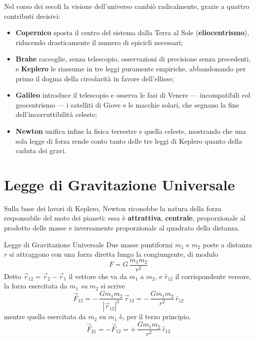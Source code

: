 Nel corso dei secoli la visione dell'universo cambiò radicalmente, grazie a quattro contributi decisivi:
\begin{itemize}
    \item \textbf{Copernico} sposta il centro del sistema dalla Terra al Sole (\textbf{eliocentrismo}), riducendo drasticamente il numero di epicicli necessari;
    \item \textbf{Brahe} raccoglie, senza telescopio, osservazioni di precisione senza precedenti, e \textbf{Keplero} le riassume in tre leggi puramente empiriche, abbandonando per primo il dogma della circolarità in favore dell'ellisse;
    \item \textbf{Galileo} introduce il telescopio e osserva le fasi di Venere --- incompatibili col geocentrismo --- i satelliti di Giove e le macchie solari, che segnano la fine dell'incorruttibilità celeste;
    \item \textbf{Newton} unifica infine la fisica terrestre e quella celeste, mostrando che una sola legge di forza rende conto tanto delle tre leggi di Keplero quanto della caduta dei gravi.
\end{itemize}

\section{Legge di Gravitazione Universale}

Sulla base dei lavori di Keplero, Newton riconobbe la natura della forza responsabile del moto dei pianeti: essa è \textbf{attrattiva}, \textbf{centrale}, proporzionale al prodotto delle masse e inversamente proporzionale al quadrato della distanza.

\begin{teorema}{Legge di Gravitazione Universale}
Due masse puntiformi $m_1$ e $m_2$ poste a distanza $r$ si attraggono con una forza diretta lungo la congiungente, di modulo
\begin{equation}
    F = G \, \frac{m_1 m_2}{r^2}
\end{equation}
Detto $\vec{r}_{12} = \vec{r}_2 - \vec{r}_1$ il vettore che va da $m_1$ a $m_2$, e $\hat{r}_{12}$ il corrispondente versore, la forza esercitata da $m_1$ \emph{su} $m_2$ si scrive
\begin{equation}
    \vec{F}_{12} = - \, \frac{G m_1 m_2}{|\vec{r}_{12}|^3} \, \vec{r}_{12}
                 = - \, \frac{G m_1 m_2}{r^2} \, \hat{r}_{12}
\end{equation}
mentre quella esercitata da $m_2$ su $m_1$ è, per il terzo principio,
\begin{equation}
    \vec{F}_{21} = -\vec{F}_{12} = + \, \frac{G m_1 m_2}{r^2} \, \hat{r}_{12}
\end{equation}
\end{teorema}

